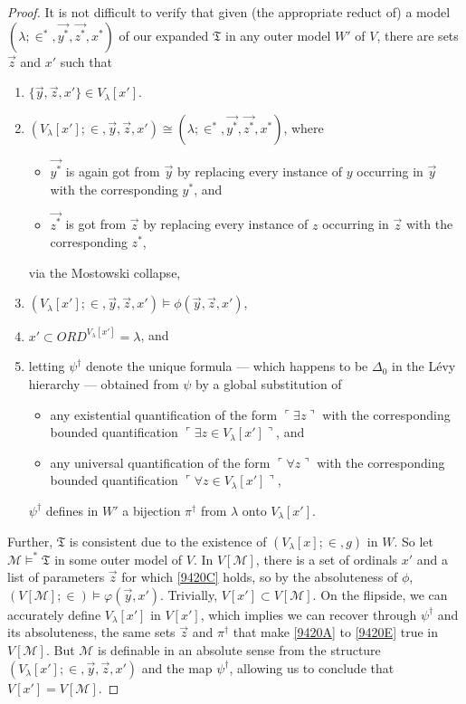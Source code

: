 \documentclass[12pt, twoside]{memoir}
\numberwithin{equation}{section}
\theoremstyle{definition}
\theoremstyle{remark}
\theoremstyle{definition}
\theoremstyle{definition}
\theoremstyle{definition}
\theoremstyle{remark}
\begin{document}
\begin{proof}
It is not difficult to verify that given (the appropriate reduct of) a model $(\lambda; \in^*, \Vec{y^*}, \Vec{z^*}, x^*)$ of our expanded $\mathfrak{T}$ in any outer model $W'$ of $V$, there are sets $\Vec{z}$ and $x'$ such that
\begin{enumerate}[label=(\Alph*)]
    \item\label{9420A} $\{\Vec{y}, \Vec{z}, x'\} \in V_{\lambda}[x']$.
    \item $(V_{\lambda}[x']; \in, \Vec{y}, \Vec{z}, x') \cong (\lambda; \in^*, \Vec{y^*}, \Vec{z^*}, x^*)$, where 
    \begin{itemize}
        \item $\Vec{y^*}$ is again got from $\Vec{y}$ by replacing every instance of $y$ occurring in $\Vec{y}$ with the corresponding $y^*$, and
        \item $\Vec{z^*}$ is got from $\Vec{z}$ by replacing every instance of $z$ occurring in $\Vec{z}$ with the corresponding $z^*$,
    \end{itemize}
    via the Mostowski collapse,
    \item\label{9420C} $(V_{\lambda}[x']; \in, \Vec{y}, \Vec{z}, x') \models \phi(\Vec{y}, \Vec{z}, x')$, 
    \item $x' \subset ORD^{V_{\lambda}[x']} = \lambda$, and
    \item\label{9420E} letting $\psi^{\dagger}$ denote the unique formula --- which happens to be $\Delta_0$ in the L\'{e}vy hierarchy --- obtained from $\psi$ by a global substitution of 
    \begin{itemize}
        \item any existential quantification of the form $\ulcorner \exists z \urcorner$ with the corresponding bounded quantification $\ulcorner \exists z \in V_{\lambda}[x'] \urcorner$, and
        \item any universal quantification of the form $\ulcorner \forall z \urcorner$ with the corresponding bounded quantification $\ulcorner \forall z \in V_{\lambda}[x'] \urcorner$,
    \end{itemize}
    $\psi^{\dagger}$ defines in $W'$ a bijection $\pi^{\dagger}$ from $\lambda$ onto $V_{\lambda}[x']$.
\end{enumerate}
Further, $\mathfrak{T}$ is consistent due to the existence of $(V_{\lambda}[x]; \in, g)$ in $W$. So let $\mathcal{M} \models^* \mathfrak{T}$ in some outer model of $V$. In $V[\mathcal{M}]$, there is a set of ordinals $x'$ and a list of parameters $\Vec{z}$ for which \ref{9420C} holds, so by the absoluteness of $\phi$, $(V[\mathcal{M}]; \in) \models \varphi(\Vec{y}, x')$. Trivially, $V[x'] \subset V[\mathcal{M}]$. On the flipside, we can accurately define $V_{\lambda}[x']$ in $V[x']$, which implies we can recover through $\psi^{\dagger}$ and its absoluteness, the same sets $\Vec{z}$ and $\pi^{\dagger}$ that make \ref{9420A} to \ref{9420E} true in $V[\mathcal{M}]$. But $\mathcal{M}$ is definable in an absolute sense from the structure $(V_{\lambda}[x']; \in, \Vec{y}, \Vec{z}, x')$ and the map $\psi^{\dagger}$, allowing us to conclude that $V[x'] = V[\mathcal{M}]$.
\end{proof}
\end{document}
